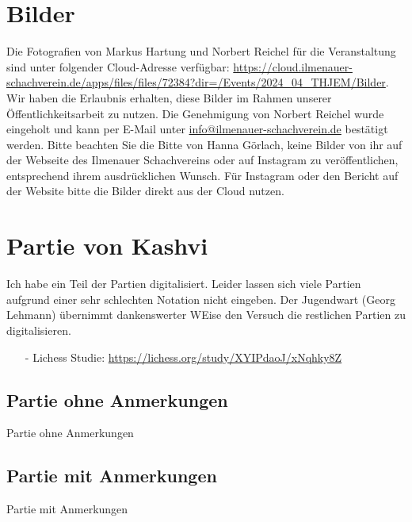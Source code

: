 \documentclass[a4paper,ngerman]{tui-algo-seminar}
\begin{document}
\clearpage


\section{Bilder}
Die Fotografien von Markus Hartung und Norbert Reichel für die Veranstaltung sind unter folgender Cloud-Adresse verfügbar: \url{https://cloud.ilmenauer-schachverein.de/apps/files/files/72384?dir=/Events/2024_04_THJEM/Bilder}. Wir haben die Erlaubnis erhalten, diese Bilder im Rahmen unserer Öffentlichkeitsarbeit zu nutzen. Die Genehmigung von Norbert Reichel wurde eingeholt und kann per E-Mail unter \href{mailto:info@ilmenauer-schachverein.de}{info@ilmenauer-schachverein.de} bestätigt werden.
Bitte beachten Sie die Bitte von Hanna Görlach, keine Bilder von ihr auf der Webseite des Ilmenauer Schachvereins oder auf Instagram zu veröffentlichen, entsprechend ihrem ausdrücklichen Wunsch. Für Instagram oder den Bericht auf der Website bitte die Bilder direkt aus der Cloud nutzen.




\clearpage
\section{Partie von Kashvi}
Ich habe ein Teil der Partien digitalisiert. Leider lassen sich viele Partien aufgrund einer sehr schlechten Notation nicht eingeben. Der Jugendwart (Georg Lehmann) übernimmt dankenswerter WEise den Versuch die restlichen Partien zu digitalisieren.
\begin{itemize}
    \item[-] Lichess Studie: \url{https://lichess.org/study/XYIPdaoJ/xNqhky8Z}
\end{itemize}


\subsection{Partie ohne Anmerkungen}
Partie ohne Anmerkungen
\subsection{Partie mit Anmerkungen}

Partie mit Anmerkungen
\end{document}
